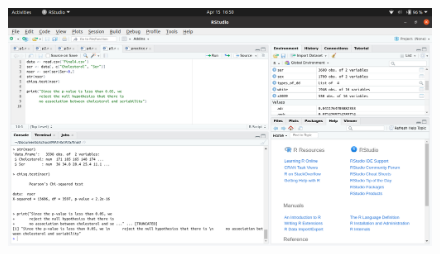 \documentclass[12pt]{article}
\begin{document}
\begin{enumerate}
	\begin{figure}[!h]
		\centering
		\includegraphics[width=\linewidth]{p5.png}
	\end{figure}
\end{enumerate}
\end{document}
